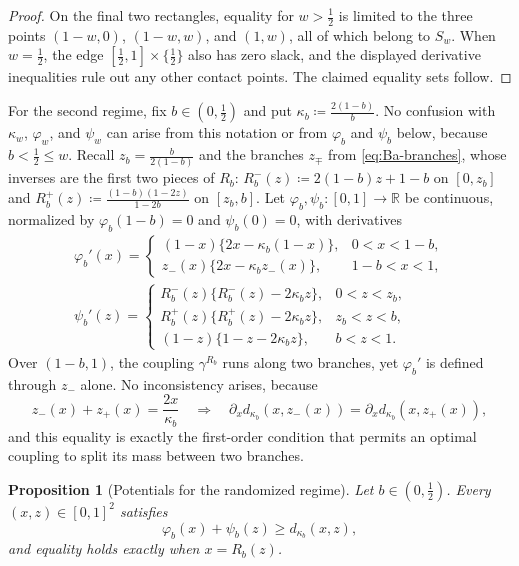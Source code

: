 \documentclass[11pt,a4paper]{article}
\newtheorem{proposition}[theorem]{Proposition}
\theoremstyle{remark}
\newcommand{\R}{\mathbb{R}}
\newcommand{\1}{\mathbf{1}}
\begin{document}
\begin{proof}
On the final two rectangles, equality for $w>\frac12$ is limited to the three points $(1-w,0)$, $(1-w,w)$, and $(1,w)$, all of which belong to $S_w$.
When $w=\frac12$, the edge $[\frac12,1]\times\{\frac12\}$ also has zero slack, and the displayed derivative inequalities rule out any other contact points.
The claimed equality sets follow.
\end{proof}

For the second regime, fix $b\in(0,\frac12)$ and put $\kappa_b\coloneqq\frac{2(1-b)}{b}$.
No confusion with $\kappa_w$, $\varphi_w$, and $\psi_w$ can arise from this notation or from $\varphi_b$ and $\psi_b$ below, because $b<\frac12\le w$.
Recall $z_b=\frac{b}{2(1-b)}$ and the branches $z_\mp$ from \eqref{eq:Ba-branches}, whose inverses are the first two pieces of $R_b$: $R_b^-(z)\coloneqq2(1-b)z+1-b$ on $[0,z_b]$ and $R_b^+(z)\coloneqq\frac{(1-b)(1-2z)}{1-2b}$ on $[z_b,b]$.
Let $\varphi_b,\psi_b:[0,1]\to\R$ be continuous, normalized by $\varphi_b(1-b)=0$ and $\psi_b(0)=0$, with derivatives
\begin{equation}
  \label{eq:potential-B}
  \begin{gathered}
  \varphi_b'(x)=
  \begin{cases}
    (1-x)\bigl\{2x-\kappa_b(1-x)\bigr\}, & 0<x<1-b,\\[0.3ex]
    z_-(x)\bigl\{2x-\kappa_bz_-(x)\bigr\}, & 1-b<x<1,
  \end{cases}\\[0.5ex]
  \psi_b'(z)=
  \begin{cases}
    R_b^-(z)\bigl\{R_b^-(z)-2\kappa_bz\bigr\}, & 0<z<z_b,\\[0.3ex]
    R_b^+(z)\bigl\{R_b^+(z)-2\kappa_bz\bigr\}, & z_b<z<b,\\[0.3ex]
    (1-z)\bigl\{1-z-2\kappa_bz\bigr\}, & b<z<1.
  \end{cases}
  \end{gathered}
\end{equation}
Over $(1-b,1)$, the coupling $\gamma^{R_b}$ runs along two branches, yet $\varphi_b'$ is defined through $z_-$ alone.
No inconsistency arises, because
\begin{equation}
  \label{eq:branch-sum}
  z_-(x)+z_+(x)=\frac{2x}{\kappa_b}
  \quad\Longrightarrow\quad
  \partial_xd_{\kappa_b}(x,z_-(x))=\partial_xd_{\kappa_b}(x,z_+(x)),
\end{equation}
and this equality is exactly the first-order condition that permits an optimal coupling to split its mass between two branches.

\begin{proposition}[Potentials for the randomized regime]
\label{prop:dual-B}
Let $b\in(0,\frac12)$.
Every $(x,z)\in[0,1]^2$ satisfies
\begin{equation*}
    \varphi_b(x)+\psi_b(z)\ge d_{\kappa_b}(x,z),
\end{equation*}
and equality holds exactly when $x=R_b(z)$.
\end{proposition}
\end{document}
